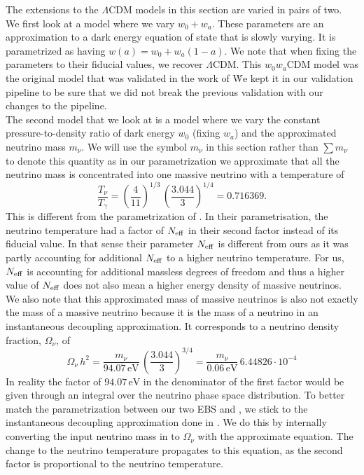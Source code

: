 \documentclass[../main.tex]{subfiles}
\begin{document}
The extensions to the $\Lambda$CDM models in this section are varied in pairs of two. We first look at a model where we vary $w_0+w_a$. These parameters are an approximation to a dark energy equation of state that is slowly varying. It is parametrized as having $w(a) = w_0 + w_a(1-a)$. We note that when fixing the parameters to their fiducial values, we recover $\Lambda$CDM. This $w_0w_a$CDM model was the original model that was validated in the work of \. We kept it in our validation pipeline to be sure that we did not break the previous validation with our changes to the pipeline.\\
The second model that we look at is a model where we vary the constant pressure-to-density ratio of dark energy $w_0$ (fixing $w_a$) and the approximated neutrino mass $m_\nu$. We will use the symbol $m_\nu$ in this section rather than $\sum m_\nu$ to denote this quantity as in our parametrization we approximate that all the neutrino mass is concentrated into one massive neutrino with a temperature of \begin{equation}
    \frac{T_\nu}{T_\gamma} = \left(\frac{4}{11}\right)^{1/3}\,\left(\frac{3.044}{3}\right)^{1/4} = 0.716369.
\end{equation}  
This is different from the parametrization of \cite{casas2023euclid}. In their parametrisation, the neutrino temperature had a factor of $N_\mathrm{eff}$ in their second factor instead of its fiducial value. In that sense their parameter $N_\mathrm{eff}$ is different from ours as it was partly accounting for additional $N_\mathrm{eff}$ to a higher neutrino temperature. For us, $N_\mathrm{eff}$ is accounting for additional massless degrees of freedom and thus a higher value of $N_\mathrm{eff}$ does not also mean a higher energy density of massive neutrinos.\\
We also note that this approximated mass of massive neutrinos is also not exactly the mass of a massive neutrino because it is the mass of a neutrino in an instantaneous decoupling approximation. It corresponds to a neutrino density fraction, $\Omega_\nu$, of 
\begin{equation}
    \label{eq:omega_nu}
    \Omega_\nu\,h^2= \frac{m_\nu}{94.07\,\mathrm{eV}}\,\left(\frac{3.044}{3}\right)^{3/4} = \frac{m_\nu}{0.06\,\mathrm{eV}}\,6.44826\cdot10^{-4}
\end{equation}
In reality the factor of $94.07\,\mathrm{eV}$ in the denominator of the first factor would be given through an integral over the neutrino phase space distribution. To better match the parametrization between our two EBS \class and \camb, we stick to the instantaneous decoupling approximation done in \camb. We do this by internally converting the input neutrino mass in \class to $\Omega_\nu$ with the approximate equation. The change to the neutrino temperature propagates to this equation, as the second factor is proportional to the neutrino temperature.\\
\end{document}
